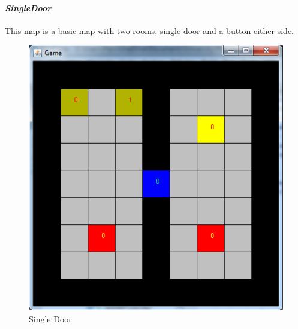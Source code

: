 \documentclass{IEEEtran}
\begin{document}
\paragraph{\emph{SingleDoor}} This map is a basic map with two rooms, single door and a button either side.
\begin{figure}[H]
\centering
\includegraphics[scale=0.35]{InitialState}
\caption{Single Door \protect\footnotemark}
\label{SingleDoor}
\end{figure}
\end{document}
